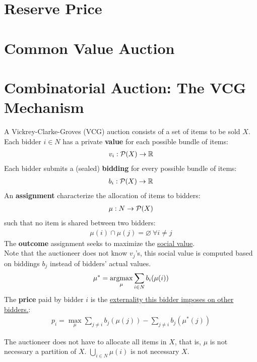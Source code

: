 \documentclass{article}
\begin{document}
	\section{Reserve Price}
	
	\section{Common Value Auction}
	
	\section{Combinatorial Auction: The VCG Mechanism}
	\begin{definition}
		A Vickrey-Clarke-Groves (VCG) auction consists of a set of items to be sold $X$. Each bidder $i \in N$ has a private \textbf{value} for each possible bundle of items:
		\begin{align}
			v_i: \mathcal{{P}}(X) \to \mathbb{R}
		\end{align}
		Each bidder submits a (sealed) \textbf{bidding} for every possible bundle of items:
		\begin{align}
			b_i: \mathcal{{P}}(X) \to \mathbb{R}
		\end{align}
		An \textbf{assignment} characterize the allocation of items to bidders:
		\begin{align}
			\mu: N \to \mathcal{{P}}(X)
		\end{align}
		such that no item is shared between two bidders:
		\begin{align}
			\mu(i) \cap \mu(j) = \varnothing\ \forall i \neq j
		\end{align}
		The \textbf{outcome} assignment seeks to maximize the \ul{social value}. \\
		Note that the auctioneer does not know $v_j$'s, this social value is computed based on biddings $b_j$ instead of bidders' actual values.
		\begin{align}
			\mu^* = \operatorname*{argmax}_{\mu} \sum_{i \in N} b_i(\mu(i))
		\end{align}
		The \textbf{price} paid by bidder $i$ is the \ul{externality this bidder imposes on other bidders.}:
		\begin{align}
			p_i = \max_\mu \sum_{j \neq i} b_j(\mu(j)) - \sum_{j \neq i}b_j(\mu^*(j))
		\end{align}
	\end{definition}
	
	\begin{remark}
		The auctioneer does not have to allocate all items in $X$, that is, $\mu$ is not necessary a partition of $X$. $\bigcup_{i \in N}\mu(i)$ is not necessary $X$.
	\end{remark}
	
\end{document}
